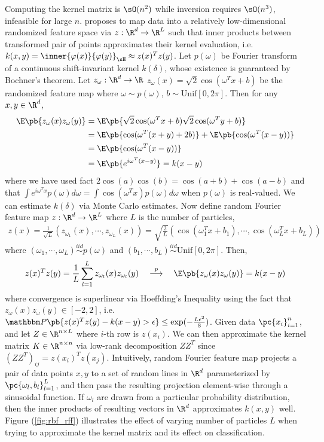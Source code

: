 \documentclass[11pt]{article}
\begin{document}
Computing the kernel matrix is $\sO(n^2)$ while inversion requires $\sO(n^3)$, infeasible for large $n$. \cite{rahimiRandomFeaturesLargeScale2007} proposes to map data into a relatively low-dimensional randomized feature space via $z:\R^d\to\R^L$ such that inner products between transformed pair of points approximates their kernel evaluation, i.e. $k(x,y) = \inner{\varphi(x)}{\varphi(y)}_{\sH} \approx z(x)^Tz(y)$. Let $p(\omega)$ be Fourier transform of a continuous shift-invariant kernel $k(\delta)$, whose existence is guaranteed by Bochner's theorem. Let $z_{\omega}:\R^d\to \R$ $z_{\omega}(x) = \sqrt{2}\cos(\omega^Tx+b)$ be the randomized feature map where $\omega\sim p(\omega)$, $b\sim \text{Unif}[0,2\pi]$. Then for any $x,y\in\R^d$,
\begin{align*}
    \E\pb{z_{\omega}(x)z_{\omega}(y)}
        &= \E\pb{ \sqrt{2} \cos(\omega^T x + b) \sqrt{2}\cos(\omega^Ty+b) } \\
        &= \E\pb{ \cos(\omega^T(x+y)+2b) } + \E\pb{ \cos(\omega^T(x-y)) } \\
        &= \E\pb{ \cos(\omega^T(x-y)) } \\
        &= \E\pb{ e^{i\omega^T(x-y)} } = k(x-y)
\end{align*}
where we have used fact $2\cos(a)\cos(b)=\cos(a+b)+\cos(a-b)$ and that $\int e^{i\omega^Tx} p(\omega)d\omega = \int \cos(\omega^Tx) p(\omega)d\omega$ when $p(\omega)$ is real-valued. We can estimate $k(\delta)$ via Monte Carlo estimates. Now define random Fourier feature map $z:\R^d\to\R^L$ where $L$ is the number of particles,
\begin{align}
    z(x)
        = \frac{1}{\sqrt{L}} (z_{\omega_1}(x), \cdots, z_{\omega_L}(x)) 
        = \sqrt{\frac{2}{L}}(\cos(\omega_1^Tx+b_1), \cdots, \cos(\omega_L^Tx+b_L))
\end{align}
where $(\omega_1,\cdots,\omega_L) \overset{iid}{\sim} p(\omega)$ and $(b_1,\cdots,b_L)\overset{iid}{\sim} \text{Unif}[0,2\pi]$. Then,
\begin{align}
    z(x)^Tz(y)
        = \frac{1}{L} \sum_{l=1}^L z_{\omega_l}(x) z_{\omega_l}(y)
        \quad\overset{p}{\longrightarrow}\quad 
        \E\pb{z_{\omega}(x)z_{\omega}(y)}
        = k(x-y)
\end{align}
where convergence is superlinear via Hoeffding's Inequality using the fact that $z_{\omega}(x)z_{\omega}(y) \in [-2,2]$, i.e. $\bbP\pb{ z(x)^Tz(y) - k(x-y) > \epsilon } \leq \exp(-\frac{L\epsilon^2}{8})$. Given data $\pc{x_i}_{i=1}^n$, and let $Z\in\R^{n\times L}$ where $i$-th row is $z(x_i)$. We can then approximate the kernel matrix $K\in\R^{n\times n}$ via low-rank decomposition $ZZ^T$ since $(ZZ^T)_{ij} = z(x_i)^T z(x_j)$. Intuitively, random Fourier feature map projects a pair of data points $x,y$ to a set of random lines in $\R^d$ parameterized by $\pc{\omega_l,b_l}_{l=1}^L$, and then pass the resulting projection element-wise through a sinusoidal function. If $\omega_l$ are drawn from a particular probability distribution, then the inner products of resulting vectors in $\R^d$ approximates $k(x,y)$ well. Figure (\ref{fig:rbf_rff}) illustrates the effect of varying number of particles $L$ when trying to approximate the kernel matrix and its effect on classification.
\end{document}
